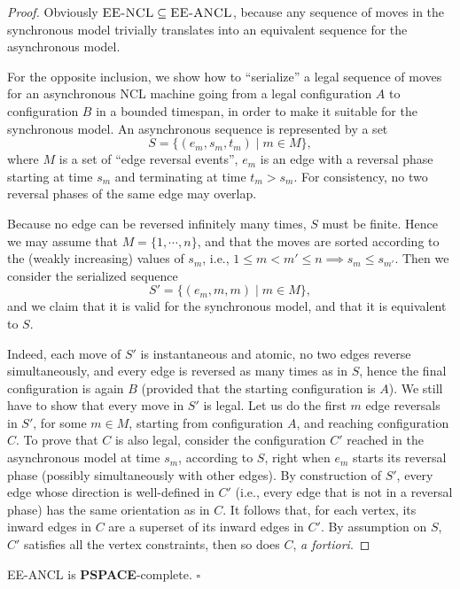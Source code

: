 \documentclass{style}
\newcommand{\complexityclass}[1]{\textbf{#1}}
\newcommand{\computproblem}[1]{\textsc{#1}}
\newcommand{\PSPACE}{\complexityclass{PSPACE}\xspace}
\newcommand{\EENCL}{\computproblem{EE-NCL}\xspace}
\newcommand{\EEANCL}{\computproblem{EE-ANCL}\xspace}
\begin{document}
\begin{proof}
Obviously $\EENCL \subseteq \EEANCL$, because any sequence of moves in the synchronous model trivially translates into an equivalent sequence for the asynchronous model.

For the opposite inclusion, we show how to ``serialize'' a legal sequence of moves for an asynchronous NCL machine going from a legal configuration $A$ to configuration $B$ in a bounded timespan, in order to make it suitable for the synchronous model. An asynchronous sequence is represented by a set
$$S=\{(e_m, s_m, t_m) \mid m\in M\},$$ where $M$ is a set of ``edge reversal events'', $e_m$ is an edge with a reversal phase starting at time $s_m$ and terminating at time $t_m > s_m$. For consistency, no two reversal phases of the same edge may overlap.

Because no edge can be reversed infinitely many times, $S$ must be finite. Hence we may assume that $M=\{1, \cdots, n\}$, and that the moves are sorted according to the (weakly increasing) values of $s_m$, i.e., $1\leqslant m < m' \leqslant n \implies s_m \leqslant s_{m'}$. Then we consider the serialized sequence
$$S'=\{(e_m, m, m) \mid m\in M\},$$
and we claim that it is valid for the synchronous model, and that it is equivalent to $S$.

Indeed, each move of $S'$ is instantaneous and atomic, no two edges reverse simultaneously, and every edge is reversed as many times as in $S$, hence the final configuration is again $B$ (provided that the starting configuration is $A$). We still have to show that every move in $S'$ is legal. Let us do the first $m$ edge reversals in $S'$, for some $m\in M$, starting from configuration $A$, and reaching configuration $C$. To prove that $C$ is also legal, consider the configuration $C'$ reached in the asynchronous model at time $s_m$, according to $S$, right when $e_m$ starts its reversal phase (possibly simultaneously with other edges). By construction of $S'$, every edge whose direction is well-defined in $C'$ (i.e., every edge that is not in a reversal phase) has the same orientation as in $C$. It follows that, for each vertex, its inward edges in $C$ are a superset of its inward edges in $C'$. By assumption on $S$, $C'$ satisfies all the vertex constraints, then so does $C$, {\it a fortiori}.
\end{proof}

\begin{cor}\label{eeancl}\EEANCL is \PSPACE-complete. \hfill $\square$\end{cor}
\end{document}
